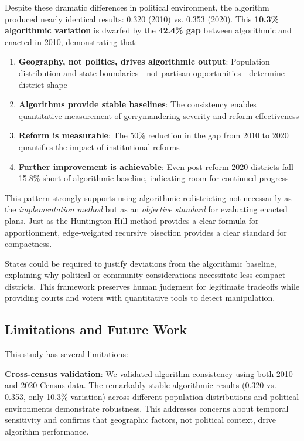 Despite these dramatic differences in political environment, the algorithm produced nearly identical results: 0.320 (2010) vs. 0.353 (2020). This \textbf{10.3\% algorithmic variation} is dwarfed by the \textbf{42.4\% gap} between algorithmic and enacted in 2010, demonstrating that:

\begin{enumerate}
\item \textbf{Geography, not politics, drives algorithmic output}: Population distribution and state boundaries—not partisan opportunities—determine district shape
\item \textbf{Algorithms provide stable baselines}: The consistency enables quantitative measurement of gerrymandering severity and reform effectiveness
\item \textbf{Reform is measurable}: The 50\% reduction in the gap from 2010 to 2020 quantifies the impact of institutional reforms
\item \textbf{Further improvement is achievable}: Even post-reform 2020 districts fall 15.8\% short of algorithmic baseline, indicating room for continued progress
\end{enumerate}

This pattern strongly supports using algorithmic redistricting not necessarily as the \textit{implementation method} but as an \textit{objective standard} for evaluating enacted plans. Just as the Huntington-Hill method provides a clear formula for apportionment, edge-weighted recursive bisection provides a clear standard for compactness.

States could be required to justify deviations from the algorithmic baseline, explaining why political or community considerations necessitate less compact districts. This framework preserves human judgment for legitimate tradeoffs while providing courts and voters with quantitative tools to detect manipulation.

\subsection{Limitations and Future Work}

This study has several limitations:

\textbf{Cross-census validation}: We validated algorithm consistency using both 2010 and 2020 Census data. The remarkably stable algorithmic results (0.320 vs. 0.353, only 10.3\% variation) across different population distributions and political environments demonstrate robustness. This addresses concerns about temporal sensitivity and confirms that geographic factors, not political context, drive algorithm performance.

